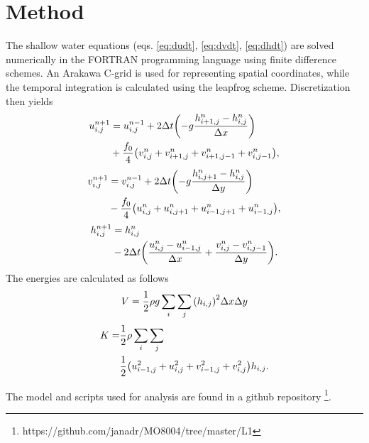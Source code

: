\section{Method}
\label{sec:method}
The shallow water equations (eqs. \ref{eq:dudt}, \ref{eq:dvdt}, \ref{eq:dhdt}) are solved numerically in the FORTRAN programming language using finite difference schemes. An Arakawa C-grid is used for representing spatial coordinates, while the temporal integration is calculated using the leapfrog scheme. Discretization then yields
	\begin{align}
		u^{n+1}_{i,j} &= u^{n-1}_{i,j} + 2\Delta t \qty(-g\frac{h^n_{i+1,j} - h^n_{i,j}}{\Delta x}) \nonumber \\
		&+ \frac{f_0}{4}\qty(v^n_{i,j} + v^n_{i+1,j} + v^n_{i+1,j-1} + v^n_{i,j-1}),
	\label{eq:u_discrete}
	\end{align}
	\begin{align}
		v^{n+1}_{i,j} &= v^{n-1}_{i,j} + 2\Delta t \qty(-g\frac{h^n_{i,j+1} - h^n_{i,j}}{\Delta y}) \nonumber \\
		&- \frac{f_0}{4}\qty(u^n_{i,j} + u^n_{i,j+1} + u^n_{i-1,j+1} + u^n_{i-1,j}),
	\label{eq:v_discrete}
	\end{align}
	\begin{align}
		h^{n+1}_{i,j} &= h^{n}_{i,j} \nonumber  \\
		&- 2\Delta t \qty(\frac{u^n_{i,j} - u^n_{i-1,j}}{\Delta x} + \frac{v^n_{i,j} - v^n_{i,j-1}}{\Delta y}).
	\label{eq:h_discrete}
	\end{align}
The energies are calculated as follows
	\begin{equation}
		V = \frac{1}{2}\rho g \sum_i \sum_j \qty(h_{i,j})^2 \Delta x \Delta y
	\label{eq:potential_discrete}
	\end{equation}
	\begin{align}
		K = &\frac{1}{2} \rho \sum_i \sum_j \nonumber \\
		&\frac{1}{2} \qty(u^2_{i-1,j} + u^2_{i,j} + v^2_{i-1,j} + v^2_{i,j})h_{i,j}.
	\end{align}

The model and scripts used for analysis are found in a github repository \footnote{https://github.com/janadr/MO8004/tree/master/L1}.
